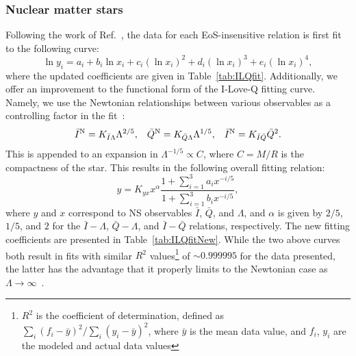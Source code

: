 \documentclass[prd,twocolumn,nofootinbib,superscriptaddress,amsmath,amssymb]{revtex4-1}
\begin{document}
\subsubsection{Nuclear matter stars}\label{sec:ilq-nuc}
Following the work of Ref.~\cite{Yagi:ILQ}, the data for each EoS-insensitive relation is first fit to the following curve:
\begin{equation}\label{eq:ILQfit}
\ln{y_i}=a_i+b_i \ln{x_i} + c_i (\ln{x_i})^2 + d_i (\ln{x_i})^3 + e_i (\ln{x_i})^4,
\end{equation}
where the updated coefficients are given in Table~\ref{tab:ILQfit}.
Additionally, we offer an improvement to the functional form of the I-Love-Q fitting curve. 
Namely, we use the Newtonian relationships between various observables as a controlling factor in the fit~\cite{Yagi:ILQ}:
\begin{equation}\label{eq:Newtonian}
\bar{I}^{\text{N}} = K_{\bar{I}\Lambda}\Lambda^{2/5}, \hspace{3mm} \bar{Q}^{\text{N}} = K_{\bar{Q}\Lambda}\Lambda^{1/5}, \hspace{3mm} \bar{I}^{\text{N}} = K_{\bar{I}\bar{Q}}\bar{Q}^{2}.
\end{equation}
This is appended to an expansion in $\Lambda^{-1/5} \propto C$, where $C=M/R$ is the compactness of the star.
This results in the following overall fitting relation:
\begin{equation}\label{eq:ILQfitNew}
y=K_{yx} x^{\alpha} \frac{1+\sum_{i=1}^3 a_i x^{-i/5}}{1+\sum_{i=1}^3 b_i x^{-i/5}},
\end{equation}
where $y$ and $x$ correspond to NS observables $\bar{I}$, $\bar{Q}$, and $\Lambda$, and $\alpha$ is given by $2/5$, $1/5$, and $2$ for the $\bar{I}-\Lambda$, $\bar{Q}-\Lambda$, and $\bar{I}-\bar{Q}$ relations, respectively.
The new fitting coefficients are presented in Table~\ref{tab:ILQfitNew}.
While the two above curves both result in fits with similar $R^2$ values\footnote{$R^2$ is the coefficient of determination, defined as $\sum_i(f_i-\bar{y})^2/\sum_i(y_i-\bar{y})^2$, where $\bar{y}$ is the mean data value, and $f_i$, $y_i$ are the modeled and actual data values} of $\sim 0.999995$ for the data presented, the latter has the advantage that it properly limits to the Newtonian case as $\Lambda \rightarrow \infty$~\cite{Yagi:binLove}.
\end{document}
